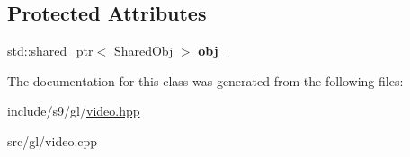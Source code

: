 \subsection*{\-Protected \-Attributes}
\begin{DoxyCompactItemize}
\item 
\hypertarget{classs9_1_1gl_1_1VidCam_a7ff9107052366f02d700a4c7dffe2397}{std\-::shared\-\_\-ptr$<$ \hyperlink{structs9_1_1gl_1_1VidCam_1_1SharedObj}{\-Shared\-Obj} $>$ {\bfseries obj\-\_\-}}\label{classs9_1_1gl_1_1VidCam_a7ff9107052366f02d700a4c7dffe2397}

\end{DoxyCompactItemize}


\-The documentation for this class was generated from the following files\-:\begin{DoxyCompactItemize}
\item 
include/s9/gl/\hyperlink{video_8hpp}{video.\-hpp}\item 
src/gl/video.\-cpp\end{DoxyCompactItemize}
